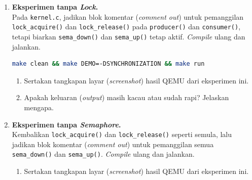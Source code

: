 \begin{enumerate}

	\item \textbf{Eksperimen tanpa \textit{Lock}.}\\
	      Pada \texttt{kernel.c}, jadikan blok komentar (\textit{comment out}) untuk pemanggilan \texttt{lock\_acquire()} dan \texttt{lock\_release()} pada \texttt{producer()} dan \texttt{consumer()}, tetapi biarkan \texttt{sema\_down()} dan \texttt{sema\_up()} tetap aktif. \textit{Compile} ulang dan jalankan.

	      \begin{lstlisting}[language=bash, caption={Kompilasi untuk eksperimen tanpa \textit{lock}}]
make clean && make DEMO=-DSYNCHRONIZATION && make run
    \end{lstlisting}

	      \begin{enumerate}
		      \item Sertakan tangkapan layar (\textit{screenshot}) hasil QEMU dari eksperimen ini.



		      \item Apakah keluaran (\textit{output}) masih kacau atau sudah rapi? Jelaskan mengapa.
	      \end{enumerate}

	\item \textbf{Eksperimen tanpa \textit{Semaphore}.}\\
	      Kembalikan \texttt{lock\_acquire()} dan \texttt{lock\_release()} seperti semula, lalu jadikan blok komentar (\textit{comment out}) untuk pemanggilan semua \texttt{sema\_down()} dan \texttt{sema\_up()}. \textit{Compile} ulang dan jalankan.

	      \begin{enumerate}
		      \item Sertakan tangkapan layar (\textit{screenshot}) hasil QEMU dari eksperimen ini.


\end{enumerate}
\end{enumerate}

